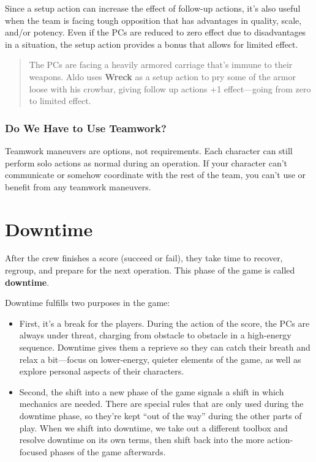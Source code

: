 \documentclass[11pt,fleqn,a5paper]{book}
\newcommand{\gameterm}[1]{\textbf{#1}}
\begin{document}
Since a setup action can increase the effect of follow-up actions, it’s also useful when the team is facing tough opposition that has advantages in quality, scale, and/or potency. Even if the PCs are reduced to zero effect due to disadvantages in a situation, the setup action provides a bonus that allows for limited effect.

\begin{quote}
	The PCs are facing a heavily armored carriage that’s immune to their weapons. Aldo uses \gameterm{Wreck}  as a setup action to pry some of the armor loose with his crowbar, giving follow up actions +1 effect---going from zero to limited effect.
\end{quote} 

\section{Do We Have to Use Teamwork?}

Teamwork maneuvers are options, not requirements. Each character can still perform solo actions as normal during an operation. If your character can’t communicate or somehow coordinate with the rest of the team, you can’t use or benefit from any teamwork maneuvers.

\part{Downtime}

After the crew finishes a score (succeed or fail), they take time to recover, regroup, and prepare for the next operation. This phase of the game is called \textbf{downtime}.

Downtime fulfills two purposes in the game:

\begin{itemize}
	\item First, it’s a break for the players. During the action of the score, the PCs are always under threat, charging from obstacle to obstacle in a high-energy sequence. Downtime gives them a reprieve so they can catch their breath and relax a bit---focus on lower-energy, quieter elements of the game, as well as explore personal aspects of their characters.
	\item Second, the shift into a new phase of the game signals a shift in which mechanics are needed. There are special rules that are only used during the downtime phase, so they’re kept “out of the way” during the other parts of play. When we shift into downtime, we take out a different toolbox and resolve downtime on its own terms, then shift back into the more action-focused phases of the game afterwards.
\end{itemize}
\end{document}
